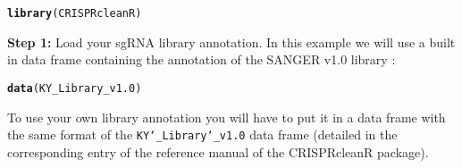 \documentclass{article}\usepackage[]{graphicx}\usepackage[]{color}
\makeatletter
\newcommand{\hlstd}[1]{\textcolor[rgb]{0.345,0.345,0.345}{#1}}%
\newcommand{\hlkwd}[1]{\textcolor[rgb]{0.737,0.353,0.396}{\textbf{#1}}}%
\newenvironment{kframe}{%
 \def\at@end@of@kframe{}%
 \ifinner\ifhmode%
  \def\at@end@of@kframe{\end{minipage}}%
  \begin{minipage}{\columnwidth}%
 \fi\fi%
 \def\FrameCommand##1{\hskip\@totalleftmargin \hskip-\fboxsep
 \colorbox{shadecolor}{##1}\hskip-\fboxsep
     \hskip-\linewidth \hskip-\@totalleftmargin \hskip\columnwidth}%
 \MakeFramed {\advance\hsize-\width
   \@totalleftmargin\z@ \linewidth\hsize
   \@setminipage}}%
 {\par\unskip\endMakeFramed%
 \at@end@of@kframe}
\newenvironment{knitrout}{}{} %
\makeatother
\begin{document}
\begin{knitrout}
\color{fgcolor}\begin{kframe}
\begin{alltt}
    \hlkwd{library}\hlstd{(CRISPRcleanR)}
\end{alltt}


{\ttfamily\noindent\itshape\color{messagecolor}{\#\# Loading required package: stringr}}

{\ttfamily\noindent\itshape\color{messagecolor}{\#\# Loading required package: DNAcopy}}

{\ttfamily\noindent\itshape\color{messagecolor}{\#\# Loading required package: pROC}}

{\ttfamily\noindent\itshape{}}

{\ttfamily\noindent\itshape\color{messagecolor}{\#\# \\\#\# Attaching package: 'pROC'}}

{\ttfamily\noindent\itshape\color{messagecolor}{\#\# The following objects are masked from 'package:stats':\\\#\# \\\#\#\ \ \ \  cov, smooth, var}}

{\ttfamily\noindent\itshape\color{messagecolor}{\#\# Loading required package: pracma}}\end{kframe}
\end{knitrout}



\textbf{Step 1:} Load your sgRNA library annotation. In this example we will use a built in data frame containing the annotation of the SANGER v1.0 library \cite{Tzelepis:2016ix}:
\begin{knitrout}
\color{fgcolor}\begin{kframe}
\begin{alltt}
\hlkwd{data}\hlstd{(KY_Library_v1.0)}
\end{alltt}
\end{kframe}
\end{knitrout}

To use your own library annotation you will have to put it in a data frame with the same format of the \texttt{KY\char`_Library\char`_v1.0} data frame (detailed in the corresponding entry of the reference manual of the CRISPRcleanR package).\\
\end{document}
